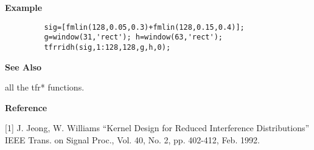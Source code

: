 \newpage

{\bf \large \sf Example}
\begin{verbatim}
         sig=[fmlin(128,0.05,0.3)+fmlin(128,0.15,0.4)];  
         g=window(31,'rect'); h=window(63,'rect');  
         tfrridh(sig,1:128,128,g,h,0);
\end{verbatim}
\vspace*{.5cm}


{\bf \large \sf See Also}\\
\hspace*{1.5cm}
\begin{minipage}[t]{13.5cm}
all the {\ty tfr*} functions.
\end{minipage}
\vspace*{.5cm}


{\bf \large \sf Reference}\\
\hspace*{1.5cm}
\begin{minipage}[t]{13.5cm}
[1] J. Jeong, W. Williams ``Kernel Design for Reduced Interference
Distributions'' IEEE Trans. on Signal Proc., Vol. 40, No. 2, pp. 402-412,
Feb. 1992.
\end{minipage}

